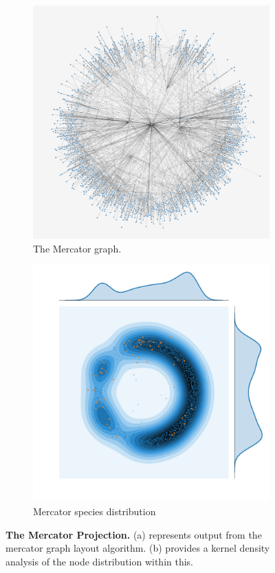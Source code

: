 \begin{figure}[H]
     \centering
      \begin{subfigure}[b]{.495\textwidth}
         \centering
     \includegraphics[width=\textwidth,angle=90]{figures_c1/layout/merc1.png}
         \caption{The Mercator graph.}
     \end{subfigure}
    \begin{subfigure}[b]{.495\textwidth}
         \centering
     \includegraphics[width=\textwidth]{figures_c1/layout/merc_aphh.pdf}
     \caption{Mercator species distribution}
     \end{subfigure}
        \caption{\textbf{The Mercator Projection.} (a) represents output from the mercator graph layout algorithm. (b) provides a kernel density analysis of the node distribution within this. }
        \label{fig:merc}
\end{figure}

